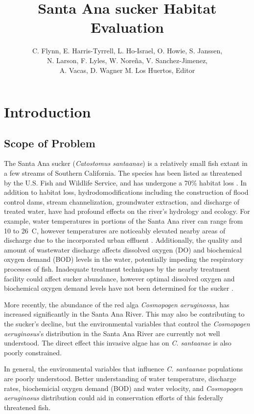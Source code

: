 \documentclass{article}\usepackage[]{graphicx}\usepackage[]{color}
\title{Santa Ana sucker Habitat Evaluation}
\author{C. Flynn, E. Harris-Tyrrell, L. Ho-Israel, O. Howie, S. Janssen, \\N. Larson, F. Lyles, W. Nore\~na, V. Sanchez-Jimenez, \\A. Vacas, D. Wagner M. Los Huertos, Editor}
\affil{Environmental Analysis 30, Fall 2016, Pomona College}
\begin{document}
\maketitle

\newpage
\tableofcontents
\newpage

\section{Introduction}

\subsection{Scope of Problem}

The Santa Ana sucker (\emph{Catostomus santaanae}) is a relatively small fish extant in a few streams of Southern California. The species has been listed as threatened by the U.S. Fish and Wildlife Service, and has undergone a 70\% habitat loss \citep{obrien2011status, usfishandwildlifeservice14}. In addition to habitat loss, hydrodomodifications including the construction of flood control dams, stream channelization, groundwater extraction, and discharge of treated water, have had profound effects on the river's hydrology and ecology. For example, water temperatures in portions of the Santa Ana river can range from 10 to 26\textdegree~C, however temperatures are noticeably elevated nearby areas of discharge due to the incorporated urban effluent \citep{greenfield70}. Additionally, the quality and amount of wastewater discharge affects dissolved oxygen (DO) and biochemical oxygen demand (BOD) levels in the water, potentially impeding the respiratory processes of fish. Inadequate treatment techniques by the nearby treatment facility could affect sucker abundance, however optimal dissolved oxygen and biochemical oxygen demand levels have not been determined for the sucker \citep{baskerville2012recovery}. 

More recently, the abundance of the red alga \emph{Cosmopogen aeruginosus}, has increased significantly in the Santa Ana River. This may also be contributing to the sucker's decline, but the environmental variables that control the \emph{Cosmopogen aeruginosus}'s distribution in the Santa Ana River are currently not well understood. The direct effect this invasive algae has on \emph{C. santaanae} is also poorly constrained. 

In general, the environmental variables that influence \emph{C. santaanae} populations are poorly understood. Better understanding of water temperature, discharge rates, biochemicial oxygen demand (BOD) and water velocity, and \emph{Cosmopogen aeruginosus} distribution could aid in conservation efforts of this federally threatened fish. 
\end{document}
